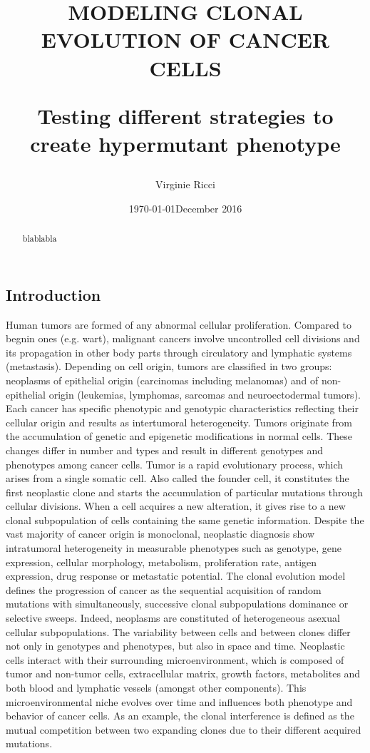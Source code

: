 \documentclass[a4paper]{article}
\title{\MakeUppercase{Modeling clonal evolution of cancer cells} \\ \begin{Large}
		Testing different strategies to create hypermutant phenotype
	\end{Large}}
\date{\today}
\author{Virginie Ricci}
\date{December 2016}
\begin{document}
\renewcommand{\headrulewidth}{1pt}
\maketitle	

\begin{multicols}{2}
\begin{abstract}
blablabla 

\end{abstract}



\sectionfont{\fontsize{12}{15}\selectfont\MakeUppercase}
\section{Introduction}
Human tumors are formed of any abnormal cellular proliferation. Compared to begnin ones (e.g. wart), malignant cancers involve uncontrolled cell divisions and its propagation in other body parts through circulatory and lymphatic systems (metastasis). Depending on cell origin, tumors are classified in two groups: neoplasms of epithelial origin (carcinomas including melanomas) and of non-epithelial origin (leukemias, lymphomas, sarcomas and neuroectodermal tumors). Each cancer has specific phenotypic and genotypic characteristics reflecting their cellular origin and results as intertumoral heterogeneity\cite{Thome}. 
Tumors originate from the accumulation of genetic and epigenetic modifications in normal cells\cite{IM}. These changes differ in number and types and result in different genotypes and phenotypes among cancer cells. Tumor is a rapid evolutionary process, which arises from a single somatic cell. Also called the founder cell, it constitutes the first neoplastic clone and starts the accumulation of particular mutations through cellular divisions. When a cell acquires a new alteration, it gives rise to a new clonal subpopulation of cells containing the same genetic information. Despite the vast majority of cancer origin is monoclonal, neoplastic diagnosis show intratumoral heterogeneity in measurable phenotypes such as genotype, gene expression, cellular morphology, metabolism, proliferation rate, antigen expression, drug response or metastatic potential\cite{DFLMM}. The clonal evolution model defines the progression of cancer as the sequential acquisition of random mutations with simultaneously, successive clonal subpopulations dominance or selective sweeps\cite{MP}. Indeed, neoplasms are constituted of heterogeneous asexual cellular subpopulations\cite{FD}. The variability between cells and between clones differ not only in genotypes and phenotypes, but also in space and time. Neoplastic cells interact with their surrounding microenvironment, which is composed of tumor and non-tumor cells, extracellular matrix, growth factors, metabolites and both blood and lymphatic vessels (amongst other components)\cite{MP}. This microenvironmental niche evolves over time and influences both phenotype and behavior of cancer cells. As an example, the clonal interference is defined as the mutual competition between two expanding clones due to their different acquired mutations\cite{GM}. 

\end{multicols}
\end{document}
